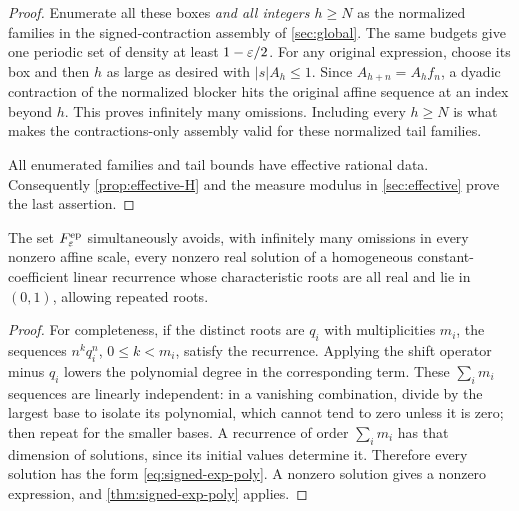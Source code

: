 \begin{proof}
Enumerate all these boxes \emph{and all integers $h\ge N$} as the
normalized families in the signed-contraction assembly of
\cref{sec:global}. The same budgets give one periodic set of density
at least $1-\varepsilon/2$. For any original expression, choose its box and
then $h$ as large as desired with $|s|A_h\le1$. Since
$A_{h+n}=A_h f_n$, a dyadic contraction of the normalized blocker
hits the original affine sequence at an index beyond $h$.
This proves infinitely many omissions. Including every $h\ge N$
is what makes the contractions-only assembly valid for these
normalized tail families.

All enumerated families and tail bounds have effective rational data.
Consequently \cref{prop:effective-H} and the measure modulus in
\cref{sec:effective} prove the last assertion.
\end{proof}

\begin{corollary}
\label{cor:recurrences}
The set $F^{\rm ep}_\varepsilon$ simultaneously avoids, with infinitely many
omissions in every nonzero affine scale, every nonzero real solution of a
homogeneous constant-coefficient linear recurrence whose characteristic
roots are all real and lie in $(0,1)$, allowing repeated roots.
\end{corollary}

\begin{proof}
For completeness, if the distinct roots are $q_i$ with multiplicities
$m_i$, the sequences $n^kq_i^n$, $0\le k<m_i$, satisfy the recurrence.
Applying the shift operator minus $q_i$ lowers the polynomial degree
in the corresponding term. These $\sum_i m_i$ sequences are linearly
independent: in a vanishing combination, divide by the largest base
to isolate its polynomial, which cannot tend to zero unless it is
zero; then repeat for the smaller bases. A recurrence of order
$\sum_i m_i$ has that dimension of solutions, since its initial
values determine it. Therefore every solution has the form
\eqref{eq:signed-exp-poly}. A nonzero solution gives a nonzero
expression, and \cref{thm:signed-exp-poly} applies.
\end{proof}
